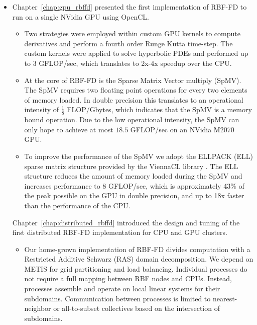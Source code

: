 \begin{itemize}
\item Chapter~\ref{chap:gpu_rbffd} presented the first implementation of RBF-FD to run on a single NVidia GPU using OpenCL. 
\begin{itemize} 

\item Two strategies were employed within custom GPU kernels to compute derivatives and perform a fourth order Runge Kutta time-step. The custom kernels were applied to solve hyperbolic PDEs and performed up to 3 GFLOP/sec, which translates to 2x-4x speedup over the CPU. 

\item  At the core of RBF-FD is the Sparse Matrix Vector multiply (SpMV). The SpMV requires two floating point operations for every two elements of memory loaded. In double precision this translates to an operational intensity of $\frac{1}{8}$ FLOP/Gbytes, which indicates that the SpMV is a memory bound operation. Due to the low operational intensity, the SpMV can only hope to achieve at most $18.5$ GFLOP/sec on an NVidia M2070 GPU.

\item To improve the performance of the SpMV we adopt the ELLPACK (ELL) sparse matrix structure provided by the ViennaCL library \cite{Rupp2010}. The ELL structure reduces the amount of memory loaded during the SpMV and increases performance to 8 GFLOP/sec, which is approximately 43\% of the peak possible on the GPU in double precision, and up to 18x faster than the performance of the CPU. 


\end{itemize}

Chapter~\ref{chap:distributed_rbffd} introduced the design and tuning of the first distributed RBF-FD implementation for CPU and GPU clusters.
\begin{itemize} 
\item Our home-grown implementation of RBF-FD divides computation with a Restricted Additive Schwarz (RAS) domain decomposition. We depend on METIS \cite{Karypis1999} for grid partitioning and load balancing. Individual processes do not require a full mapping between RBF nodes and CPUs. Instead, processes assemble and operate on local linear systems for their subdomains. Communication between processes is limited to nearest-neighbor or all-to-subset collectives based on the intersection of subdomains.


\end{itemize}
\end{itemize}
